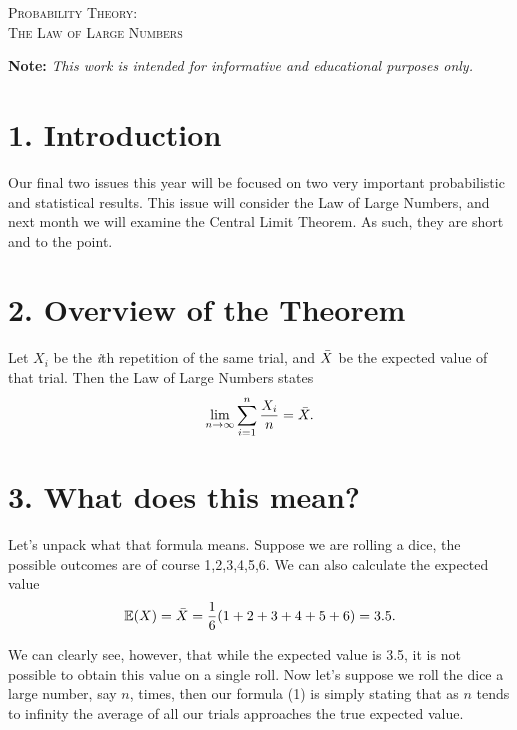 \documentclass[11pt]{article}
\begin{document}

\begin{tcolorbox}
\begin{center}
    \large
    \textsc{Probability Theory: \\ The Law of Large Numbers}
\end{center}
\end{tcolorbox}

\begin{center}
\textbf{Note:} \textit{This work is intended for informative and educational purposes only.}
\end{center}

\section*{1. Introduction}
Our final two issues this year will be focused on two very important probabilistic and statistical results. This issue will consider the Law of Large Numbers, and next month we will examine the Central Limit Theorem. As such, they are short and to the point.

\section*{2. Overview of the Theorem}
Let $X_i$ be the \textit{i}th repetition of the same trial, and $\Bar{X}$ be the expected value of that trial. Then the Law of Large Numbers states
\begin{equation}
    \lim_{n \rightarrow \infty} \sum_{i=1}^{n} \frac{X_i}{n} = \Bar{X}. 
\end{equation}

\section*{3. What does this mean?}
Let's unpack what that formula means. Suppose we are rolling a dice, the possible outcomes are of course {1,2,3,4,5,6}. We can also calculate the expected value
\begin{equation}
    \mathbb{E}(X) = \Bar{X} = \frac{1}{6} (1+2+3+4+5+6) = 3.5.
\end{equation}

We can clearly see, however, that while the expected value is 3.5, it is not possible to obtain this value on a single roll. Now let's suppose we roll the dice a large number, say $n$, times, then our formula (1) is simply stating that as $n$ tends to infinity the average of all our trials approaches the true expected value.
\end{document}
